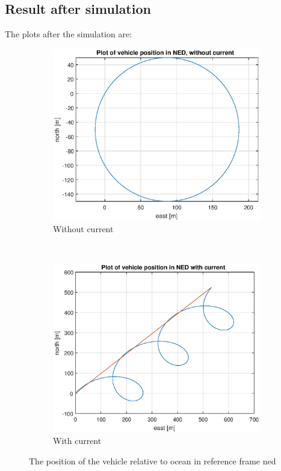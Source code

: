 \subsection*{Result after simulation}

The plots after the simulation are:

\begin{figure}[!ht]
	\centering
	\begin{subfigure}[b]{0.45\textwidth}
		\includegraphics[width=\textwidth]{figures/4_pos.eps}
		\caption{Without current}
	\end{subfigure}
	~ %
	\begin{subfigure}[b]{0.45\textwidth}
		\includegraphics[width=\textwidth]{figures/4_pos_current}
		\caption{With current}
	\end{subfigure}
	\label{fig:4_pos}
	\caption{The position of the vehicle relative to ocean in reference frame ned}
\end{figure}

